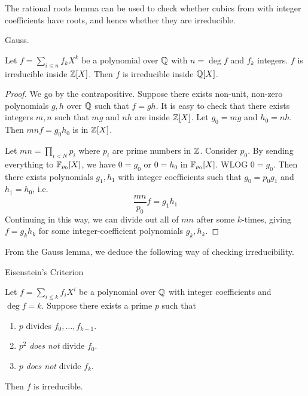 \documentclass[../book.tex]{subfiles}
\begin{document}
\begin{rmk}
    
    The rational roots lemma can be used to check 
    whether cubics from with integer coefficients have roots,
    and hence whether they are irreducible. 
    
\end{rmk}

\begin{lem} Gauss.
    
    Let $f = \sum_{i \leq n} f_k X^k$ be a polynomial over $\mathbb{Q}$ 
    with $n = \deg f$ and $f_k$ integers. 
    $f$ is irreducible inside $\mathbb{Z}[X]$. 
    Then $f$ is irreducible inside $\mathbb{Q}[X]$. 
    
\end{lem}
\begin{proof}
    
    We go by the contrapositive. 
    Suppose there exists non-unit, non-zero polynomials $g, h$ over $\mathbb{Q}$
    such that $f = g h$. 
    It is easy to check that there exists integers $m, n$ such that 
    $m g$ and $n h$ are inside $\mathbb{Z}[X]$. 
    Let $g_0 = mg$ and $h_0 = nh$. 
    Then $m n f = g_0 h_0$ is in $\mathbb{Z}[X]$.
    
    Let $m n = \prod_{i < N} p_i$ where $p_i$ are prime numbers in $\mathbb{Z}$. 
    Consider $p_0$. By sending everything to $\mathbb{F}_{p_0}[X]$, 
    we have $0 = g_0$ or $0 = h_0$ in $\mathbb{F}_{p_0}[X]$. 
    WLOG $0 = g_0$. Then there exists polynomials $g_1, h_1$ with integer coefficients
    such that $g_0 = p_0 g_1$ and $h_1 = h_0$,
    i.e. \[
        \frac{mn}{p_0} f = g_1 h_1
    \]
    Continuing in this way, we can divide out all of $mn$ after some $k$-times,  
    giving $f = g_k h_k$ for some integer-coefficient polynomials $g_k, h_k$. 
    
\end{proof}
From the Gauss lemma, we deduce the following way of checking irreducibility. 
\begin{thm} Eisenstein's Criterion
    
    Let $f = \sum_{i \leq k} f_i X^i$ be a polynomial over $\mathbb{Q}$ 
    with integer coefficients and $\deg f = k$.
    Suppose there exists a prime $p$ such that \begin{enumerate}
        \item $p$ divides $f_0, \dots, f_{k-1}$.
        \item $p^2$ \emph{does not} divide $f_0$.
        \item $p$ \emph{does not} divide $f_k$.
    \end{enumerate}
    Then $f$ is irreducible. 
    
\end{thm}
\end{document}
